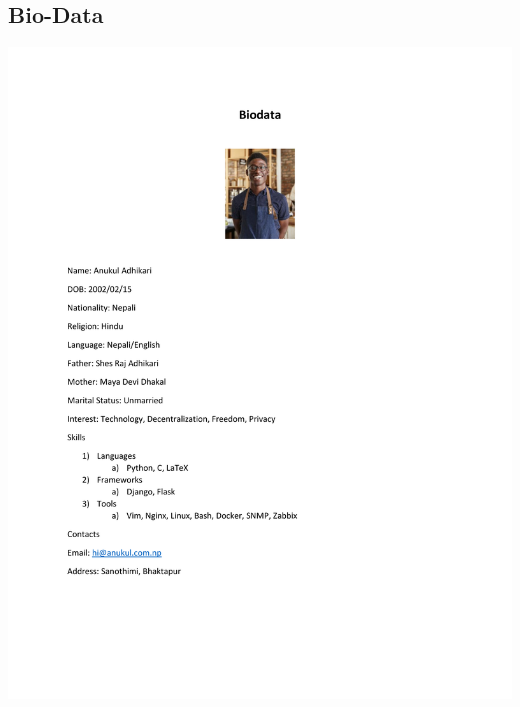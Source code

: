 \documentclass[17pt,a4paper,oneside,margin=1in]{article}
\begin{document}
\subsection{Bio-Data}
\includegraphics[width=1.5\textwidth]{./scrot/biography.png}
\pagebreak
\end{document}
